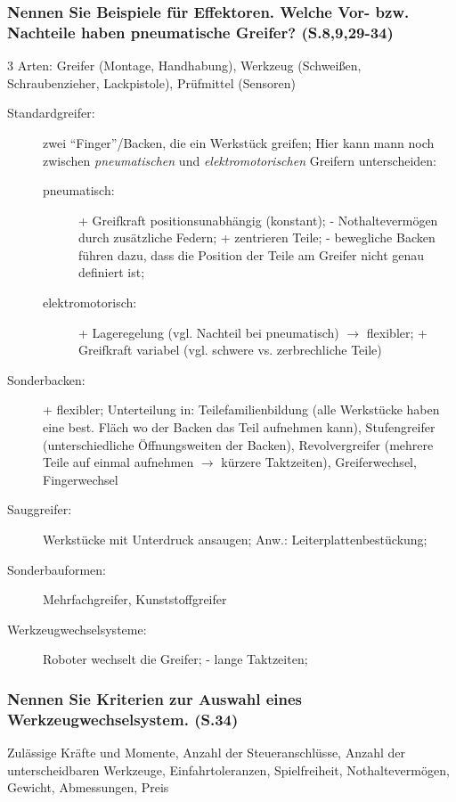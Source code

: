 \subsubsection*{Nennen Sie Beispiele für Effektoren. Welche Vor- bzw. Nachteile haben pneumatische 
Greifer? (S.8,9,29-34)}
3 Arten: Greifer (Montage, Handhabung), Werkzeug (Schweißen, Schraubenzieher, Lackpistole), 
Prüfmittel (Sensoren)
\begin{description}
\item[Standardgreifer:] zwei ``Finger''/Backen, die ein Werkstück greifen; Hier kann mann noch
  zwischen \emph{pneumatischen} und \emph{elektromotorischen} Greifern unterscheiden:
  \begin{description}
    \item[pneumatisch:] + Greifkraft positionsunabhängig (konstant); - Nothaltevermögen durch
      zusätzliche Federn; + zentrieren Teile; - bewegliche Backen führen dazu, dass die 
      Position der Teile am Greifer nicht genau definiert ist;
    \item[elektromotorisch:] + Lageregelung (vgl. Nachteil bei pneumatisch) $\rightarrow$ 
      flexibler; + Greifkraft variabel (vgl. schwere vs. zerbrechliche Teile)
  \end{description}
\item[Sonderbacken:] + flexibler; Unterteilung in: Teilefamilienbildung (alle Werkstücke haben 
  eine best. Fläch wo der Backen das Teil aufnehmen kann), Stufengreifer (unterschiedliche
  Öffnungsweiten der Backen), Revolvergreifer (mehrere Teile auf einmal aufnehmen 
  $\rightarrow$ kürzere Taktzeiten), Greiferwechsel, Fingerwechsel
\item[Sauggreifer:] Werkstücke mit Unterdruck ansaugen; Anw.: Leiterplattenbestückung;
\item[Sonderbauformen:] Mehrfachgreifer, Kunststoffgreifer
\item[Werkzeugwechselsysteme:] Roboter wechselt die Greifer; - lange Taktzeiten;
\end{description}

\subsubsection*{Nennen Sie Kriterien zur Auswahl eines Werkzeugwechselsystem. (S.34)}
Zulässige Kräfte und Momente, Anzahl der Steueranschlüsse, Anzahl der unterscheidbaren 
Werkzeuge, Einfahrtoleranzen, Spielfreiheit, Nothaltevermögen, Gewicht, Abmessungen, Preis

